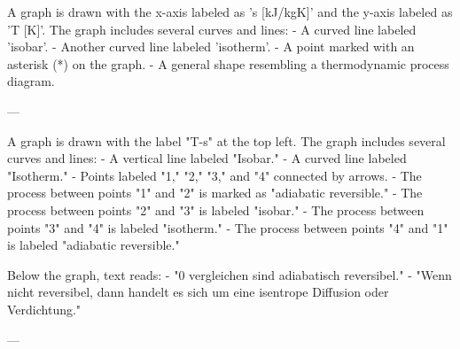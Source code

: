 A graph is drawn with the x-axis labeled as 's [kJ/kgK]' and the y-axis labeled as 'T [K]'. The graph includes several curves and lines:  
- A curved line labeled 'isobar'.  
- Another curved line labeled 'isotherm'.  
- A point marked with an asterisk (*) on the graph.  
- A general shape resembling a thermodynamic process diagram.

---

A graph is drawn with the label "T-s" at the top left. The graph includes several curves and lines:  
- A vertical line labeled "Isobar."  
- A curved line labeled "Isotherm."  
- Points labeled "1," "2," "3," and "4" connected by arrows.  
- The process between points "1" and "2" is marked as "adiabatic reversible."  
- The process between points "2" and "3" is labeled "isobar."  
- The process between points "3" and "4" is labeled "isotherm."  
- The process between points "4" and "1" is labeled "adiabatic reversible."  

Below the graph, text reads:  
- "0 vergleichen sind adiabatisch reversibel."  
- "Wenn nicht reversibel, dann handelt es sich um eine isentrope Diffusion oder Verdichtung."  

---